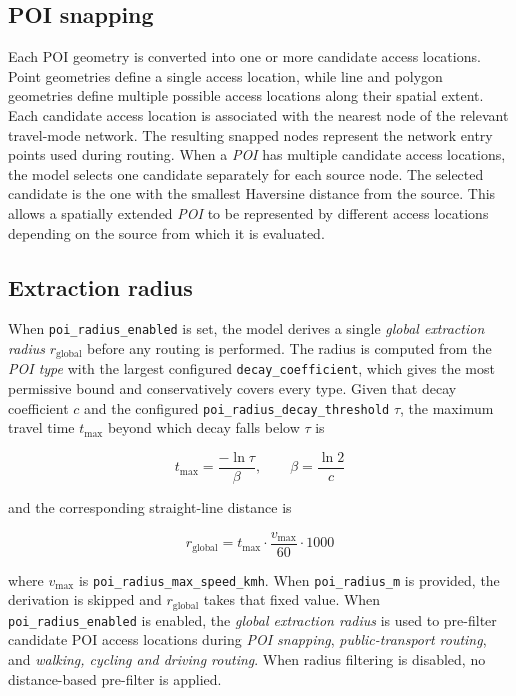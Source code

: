 \documentclass{article}
\begin{document}
\subsection{POI snapping}
Each POI geometry is converted into one or more candidate access locations. Point geometries define a single access location, while line and polygon geometries define multiple possible access locations along their spatial extent. Each candidate access location is associated with the nearest node of the relevant travel-mode network. The resulting snapped nodes represent the network entry points used during routing. When a \emph{POI} has multiple candidate access locations, the model selects one candidate separately for each source node. The selected candidate is the one with the smallest Haversine distance from the source. This allows a spatially extended \emph{POI} to be represented by different access locations depending on the source from which it is evaluated.
\subsection{Extraction radius}
When \texttt{poi\_radius\_enabled} is set, the model derives a single
\emph{global extraction radius} $r_{\text{global}}$ before any routing is
performed. The radius is computed from the \emph{POI type} with the largest
configured \texttt{decay\_coefficient}, which gives the most permissive bound
and conservatively covers every type. Given that decay coefficient $c$ and the
configured \texttt{poi\_radius\_decay\_threshold} $\tau$, the maximum travel
time $t_{\max}$ beyond which decay falls below $\tau$ is

\begin{equation}
    t_{\max} = \frac{-\ln \tau}{\beta}, \qquad \beta = \frac{\ln 2}{c}
\end{equation}

\noindent and the corresponding straight-line distance is

\begin{equation}
    r_{\text{global}} = t_{\max} \cdot \frac{v_{\max}}{60} \cdot 1000
\end{equation}

\noindent where $v_{\max}$ is \texttt{poi\_radius\_max\_speed\_kmh}.
When \texttt{poi\_radius\_m} is provided, the derivation is skipped and
$r_{\text{global}}$ takes that fixed value.
When \texttt{poi\_radius\_enabled} is enabled, the \emph{global extraction
radius} is used to pre-filter candidate POI access locations during
\emph{POI snapping}, \emph{public-transport routing}, and
\emph{walking, cycling and driving routing}. When radius filtering is
disabled, no distance-based pre-filter is applied.
\end{document}
